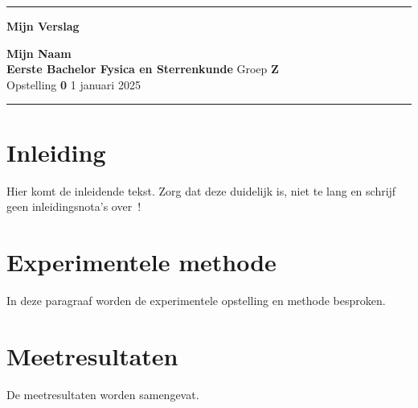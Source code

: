 \documentclass[10pt,a4paper,twoside]{article}
\begin{document}
\begin{center}
\hrule

\vspace{.4cm}
{\bf {\Huge Mijn Verslag}}
\vspace{.2cm}
\end{center}
{\bf Mijn Naam}  \\
{\bf Eerste Bachelor Fysica en Sterrenkunde} \hspace{\fill} Groep {\bf Z}\\
Opstelling {\bf 0 } \hspace{\fill}  1 januari 2025 \\
\hrule


\section{Inleiding}

Hier komt de inleidende tekst. Zorg dat deze duidelijk is, niet te lang en schrijf geen inleidingsnota's over~!



\section{Experimentele methode}
In deze paragraaf worden de experimentele opstelling en methode besproken.


\section{Meetresultaten}
De meetresultaten worden samengevat.  
\end{document}
